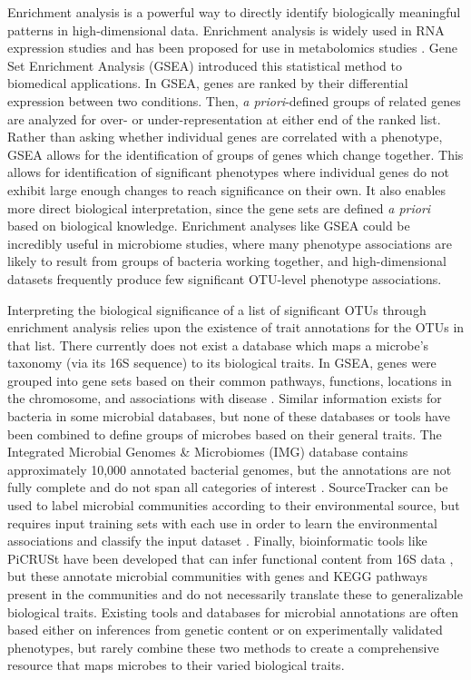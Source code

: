 \documentclass[12pt]{article}
\begin{document}
Enrichment analysis is a powerful way to directly identify biologically 
meaningful patterns in high-dimensional data. Enrichment analysis is 
widely used in RNA expression studies and has been proposed for use in 
metabolomics studies \cite{subramanian-gsea-2005, xia-msea-2010}. 
Gene Set Enrichment Analysis (GSEA) introduced
this statistical method to biomedical applications. In GSEA, genes are 
ranked by their differential expression between two conditions. Then, 
\textit{a priori}-defined groups of related genes are analyzed for 
over- or under-representation at either end of the ranked list. Rather 
than asking whether individual genes are correlated with a phenotype, 
GSEA allows for the identification of groups of genes which change 
together. This allows for identification of significant phenotypes 
where individual genes do not exhibit large enough changes to reach 
significance on their own. It also enables more direct biological 
interpretation, since the gene sets are defined \textit{a priori} 
based on biological knowledge. Enrichment analyses like GSEA
could be incredibly useful in microbiome studies, where 
many phenotype associations are likely to result from groups of
bacteria working together, and high-dimensional datasets
frequently produce few significant OTU-level phenotype associations.

Interpreting the biological significance of a list of significant OTUs 
through enrichment analysis relies upon the existence of trait annotations
for the OTUs in that list.
There currently does not exist a database which maps a microbe's
taxonomy (via its 16S sequence) to its biological traits.
In GSEA, genes were grouped into gene sets based on their common 
pathways, functions, locations in the chromosome, and associations 
with disease \cite{subramanian-gsea-2005}. 
Similar information exists for bacteria in some microbial databases, 
but none of these databases or tools have been combined to define groups 
of microbes based on their general traits. 
The Integrated Microbial Genomes \& Microbiomes (IMG) 
database contains approximately 10,000 annotated 
bacterial genomes, but the annotations are not fully complete and do 
not span all categories of interest \cite{markowitz-img-2013}. SourceTracker 
can be used to label microbial communities according to their 
environmental source, but requires input training sets with each use 
in order to learn the environmental associations and classify the input dataset \cite{knights-sourcetracker-2011}. 
Finally, bioinformatic tools like PiCRUSt have been developed that can infer functional 
content from 16S data \cite{langille-picrust-2013}, but these annotate
microbial communities with genes and KEGG pathways present in the communities
and do not necessarily translate these to generalizable biological traits.
Existing tools and databases for microbial annotations are often based either 
on inferences from genetic content or on experimentally validated phenotypes,
but rarely combine these two methods to create a comprehensive resource
that maps microbes to their varied biological traits.
\end{document}
